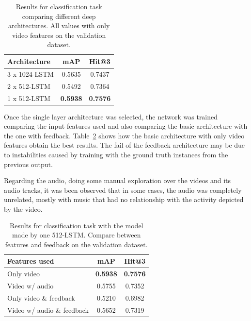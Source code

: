\begin{table}[H]
\begin{center}
\begin{tabular}{|l|c|c|}
\hline
Architecture & mAP & Hit@3 \\
\hline\hline
3 x 1024-LSTM & 0.5635 & 0.7437 \\
2 x 512-LSTM & 0.5492 & 0.7364 \\
1 x 512-LSTM & \bf0.5938 & \bf0.7576 \\
\hline
\end{tabular}
\end{center}
\caption{Results for classification task comparing different deep architectures. All values with
         only video features on the validation dataset.}
\label{table:classification_by_architecture}
\end{table}

Once the single layer architecture was selected, the network was trained comparing the input features used and also comparing the basic architecture with the one with feedback.  Table~\ref{table:classification_by_features} shows how the basic architecture  with only video features obtain the best results.
The fail of the feedback architecture may be due to instabilities caused by training with the ground truth instances from the previous output\cite{}. %

Regarding the audio, doing some manual exploration over the videos and its audio tracks, it was been observed that in some cases, the audio was completely unrelated, mostly with music that had no relationship with the activity depicted by the video.

\begin{table}[H]
\begin{center}
\begin{tabular}{|l|c|c|}
\hline
Features used & mAP & Hit@3 \\
\hline\hline
Only video & \bf0.5938 & \bf0.7576 \\
Video w/ audio & 0.5755 & 0.7352 \\
Only video \& feedback & 0.5210 & 0.6982 \\
Video w/ audio \& feedback & 0.5652 & 0.7319 \\
\hline
\end{tabular}
\end{center}
\caption{Results for classification task with the model made by one 512-LSTM. Compare between
         features and feedback on the validation dataset.}
\label{table:classification_by_features}
\end{table}

